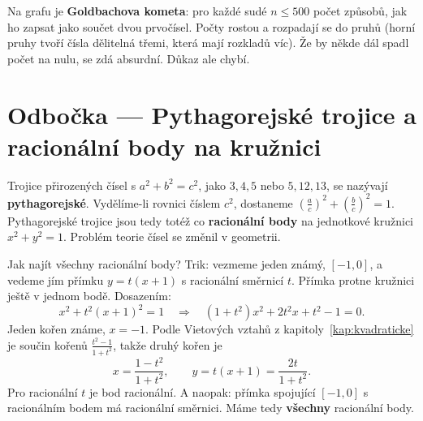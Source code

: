 Na grafu je \textbf{Goldbachova kometa}: pro každé sudé $n\leq 500$ počet způsobů, jak ho zapsat jako součet dvou prvočísel. Počty rostou a rozpadají se do pruhů (horní pruhy tvoří čísla dělitelná třemi, která mají rozkladů víc). Že by někde dál spadl počet na nulu, se zdá absurdní. Důkaz ale chybí.

\section{Odbočka --- Pythagorejské trojice a racionální body na kružnici}

Trojice přirozených čísel s $a^2 + b^2 = c^2$, jako $3, 4, 5$ nebo $5, 12, 13$, se nazývají \textbf{pythagorejské}. Vydělíme-li rovnici číslem $c^2$, dostaneme $\left(\frac{a}{c}\right)^2 + \left(\frac{b}{c}\right)^2 = 1$. Pythagorejské trojice jsou tedy totéž co \textbf{racionální body} na jednotkové kružnici $x^2 + y^2 = 1$. Problém teorie čísel se změnil v geometrii.

Jak najít všechny racionální body? Trik: vezmeme jeden známý, $[-1, 0]$, a vedeme jím přímku $y = t(x + 1)$ s racionální směrnicí $t$. Přímka protne kružnici ještě v jednom bodě. Dosazením:
\begin{equation*}
  x^2 + t^2{(x + 1)}^2 = 1\quad\Longrightarrow\quad(1 + t^2)x^2 + 2t^2x + t^2 - 1 = 0.
\end{equation*}
Jeden kořen známe, $x = -1$. Podle Vietových vztahů z kapitoly~\ref{kap:kvadraticke} je součin kořenů $\frac{t^2 - 1}{1 + t^2}$, takže druhý kořen je
\begin{equation*}
  x = \frac{1 - t^2}{1 + t^2},\qquad y = t(x + 1) = \frac{2t}{1 + t^2}.
\end{equation*}
Pro racionální $t$ je bod racionální. A naopak: přímka spojující $[-1, 0]$ s racionálním bodem má racionální směrnici. Máme tedy \textbf{všechny} racionální body.

\begin{center}
\end{center}

